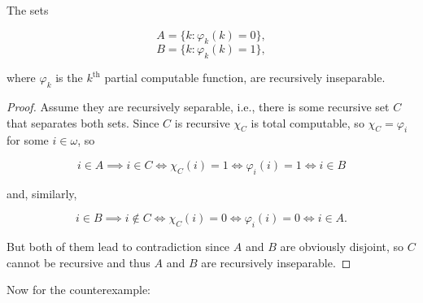 \documentclass[../main.tex]{memoir}
\begin{document}
\begin{lemma}
  \label{lemma:recursively-inseparable}

  The sets

  \[ A = \{k: \varphi_k(k) = 0\}, \]
  \[ B = \{k: \varphi_k(k) = 1\}, \]

  where $\varphi_k$ is the $k^{\text{th}}$ partial computable function, are recursively inseparable.
\end{lemma}
\begin{proof}
  Assume they are recursively separable, i.e., there is some recursive set $C$ that separates both sets. Since $C$ is recursive $\chi_C$ is total computable, so $\chi_C = \varphi_i$ for some $i \in \omega$, so

  \[ i \in A \implies i \in C \iff \chi_C(i) = 1 \iff \varphi_i(i) = 1 \iff i \in B \]

  and, similarly,

  \[ i \in B \implies i \not\in C \iff \chi_C(i) = 0 \iff \varphi_i(i) = 0 \iff i \in A. \]

  But both of them lead to contradiction since $A$ and $B$ are obviously disjoint, so $C$ cannot be recursive and thus $A$ and $B$ are recursively inseparable.
\end{proof}

Now for the counterexample:
\end{document}
